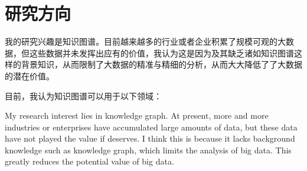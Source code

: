 \documentclass[letterpaper]{article}
\begin{document}
\begin{enumerate}
\end{enumerate}

\section{研究方向}
我的研究兴趣是知识图谱。目前越来越多的行业或者企业积累了规模可观的大数据，但这些数据并未发挥出应有的价值，我认为这是因为及其缺乏诸如知识图谱这样的背景知识，从而限制了大数据的精准与精细的分析，从而大大降低了了大数据的潜在价值。

目前，我认为知识图谱可以用于以下领域：

My research interest lies in knowledge graph. At present, more and more industries or enterprises have accumulated large amounts of data, but these data have not played the value if deserves. I think this is because it lacks background knowledge such as knowledge graph, which limits the analysis of big data. This greatly reduces the potential value of big data.
\end{document}

